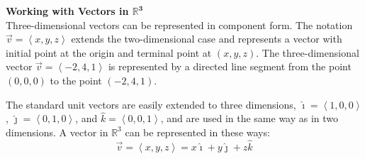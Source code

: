 \documentclass[a4paper]{article}
\let\bf\textbf
\newcommand{\la}{\left\langle}
\newcommand{\ra}{\right\rangle}
\newcommand{\ih}{\hat{\imath}}
\newcommand{\jh}{\hat{\jmath}}
\newcommand{\kh}{\hat{k}}
\begin{document}
\newpage
\noindent\bf{Working with Vectors in $\mathbb{R}^{\mathbf{3}}$}
\vspace{1mm}\\
Three-dimensional vectors can be represented in component form. The notation $\vec{v} = \la x, y, z \ra$ extends the two-dimensional case and represents a vector with initial point at the origin and terminal point at $(x, y, z)$. The three-dimensional vector $\vec{v} = \la -2, 4, 1 \ra$ is represented by a directed line segment from the point $(0,0,0)$ to the point $(-2,4,1)$.
\begin{center}
\end{center}
The standard unit vectors are easily extended to three dimensions, $\ih = \la 1,0,0 \ra$, $\jh = \la 0,1,0 \ra$, and $\kh = \la 0,0,1 \ra$, and are used in the same way as in two dimensions. A vector in $\mathbb{R}^3$ can be represented in these ways:
\begin{equation*}
    \vec{v} = \la x,y,z \ra = x\ih + y\jh + z\kh
\end{equation*}
\end{document}
